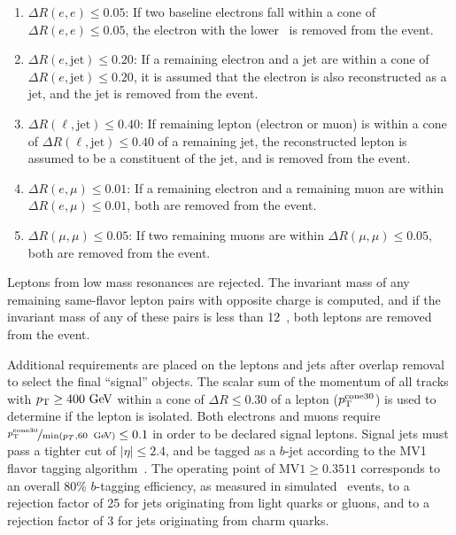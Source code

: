 \begin{enumerate}
  \item $\Delta R(e,e) \le 0.05$: If two baseline electrons fall
    within a cone of $\Delta R(e,e) \le 0.05$, the electron with the
    lower \ET\ is removed from the event.
  \item $\Delta R(e,\mathrm{jet}) \le 0.20$: If a remaining electron and a jet
    are within a cone of $\Delta R(e,\mathrm{jet}) \le 0.20$, it is
    assumed that the electron is also reconstructed as a jet, and the
    jet is removed from the event.
  \item $\Delta R(\ell,\mathrm{jet}) \le 0.40$: If remaining lepton (electron
    or muon) is within a cone of $\Delta R(\ell,\mathrm{jet}) \le 0.40$ of a
    remaining jet, the reconstructed lepton is assumed to be a constituent of
    the jet, and is removed from the event.
  \item $\Delta R(e,\mu) \le 0.01$: If a remaining electron and a remaining muon
    are within $\Delta R(e,\mu) \le 0.01$, both are removed from the event.
  \item $\Delta R(\mu,\mu) \le 0.05$: If two remaining muons are within
    $\Delta R(\mu,\mu) \le 0.05$, both are removed from the event.
\end{enumerate}

Leptons from low mass resonances are rejected.
The invariant mass of any remaining same-flavor lepton pairs with opposite
charge is computed, and if the invariant mass of any of these pairs is less
than 12~\GeV, both leptons are removed from the event.

Additional requirements are placed on the leptons and jets after overlap
removal to select the final ``signal'' objects.
The scalar sum of the momentum of all tracks with $\pt \geq 400 \GeV$
within a cone of $\Delta R \leq 0.30$ of a lepton ($p_{\mathrm{T}}^\mathrm{cone30}$) is
used to determine if the lepton is isolated.
Both electrons and muons require
$\nicefrac{\pT^{\mathrm{cone30}}}{\min(p_T, 60\,\GeV)} \leq 0.1$ in order
to be declared signal leptons.
Signal jets must pass a tighter cut of $|\eta| \leq 2.4$, and be tagged as a $b$-jet
according to the MV1 flavor tagging
algorithm~\cite{ATLAS-CONF-2014-004, ATLAS-CONF-2014-046}.
The operating point of $\mathrm{MV1} \geq 0.3511$ corresponds to an overall
80\% $b$-tagging efficiency, as measured in simulated \TTBAR\ events, to a
rejection factor of 25 for jets originating from light quarks or gluons, and to
a rejection factor of 3 for jets originating from charm quarks.

